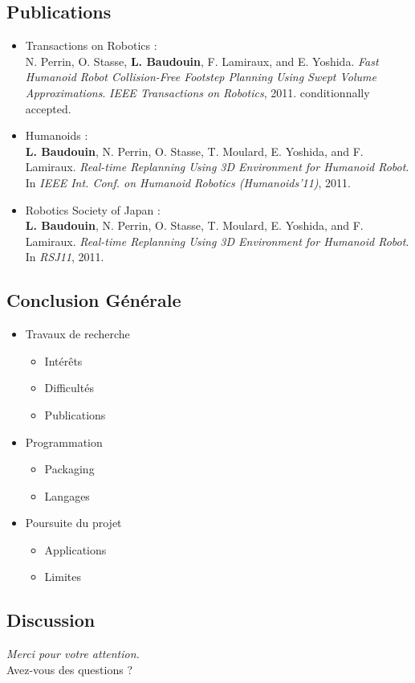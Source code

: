 \documentclass{beamer}
\begin{document}
\subsection*{Publications}
\begin{frame}
  \begin{itemize}
    \item Transactions on Robotics :\\
N. Perrin, O. Stasse, \textbf{L. Baudouin}, F. Lamiraux, and E. Yoshida. \emph{Fast Humanoid Robot Collision-Free Footstep Planning Using Swept Volume Approximations}. \textit{IEEE Transactions on Robotics}, 2011. conditionnally accepted.

    \item Humanoids :\\
\textbf{L. Baudouin}, N. Perrin, O. Stasse, T. Moulard, E. Yoshida, and F. Lamiraux. \emph{Real-time Replanning Using 3D Environment for Humanoid Robot}.
In \textit{IEEE Int. Conf. on Humanoid Robotics (Humanoids’11)}, 2011.


    \item Robotics Society of Japan :\\
\textbf{L. Baudouin}, N. Perrin, O. Stasse, T. Moulard, E. Yoshida, and F. Lamiraux. \emph{Real-time Replanning Using 3D Environment for Humanoid Robot}.
In \textit{RSJ11}, 2011.
      
  \end{itemize}
\end{frame}

\subsection*{Conclusion Générale}
\begin{frame}
  \begin{itemize}
  \item Travaux de recherche
    \begin{itemize}
    \item Intérêts
    \item Difficultés
    \item Publications
   \end{itemize}
  \item Programmation
    \begin{itemize}
    \item Packaging
    \item Langages
    \end{itemize}
  \item Poursuite du projet
    \begin{itemize}
    \item Applications
    \item Limites
    \end{itemize}
  \end{itemize}
\end{frame}

\subsection*{Discussion}
\begin{frame}
  \begin{center}
    \textit{Merci pour votre attention.}\\
    \huge{Avez-vous des questions ?}
  \end{center}
\end{frame}

\end{document}

